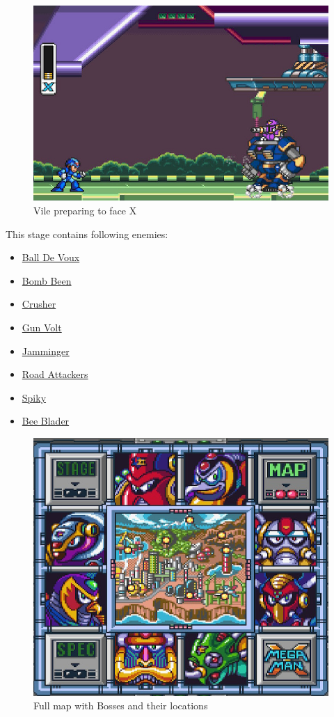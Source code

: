 \begin{figure}[htp]
	\centering
	\includegraphics[width=0.5\linewidth]{figures/X1/Highway_screenshot_3.jpg}
	\caption{Vile preparing to face X}
\end{figure}
This stage contains following enemies\cite{wiki:Highway}:
\begin{itemize}
	\item \hyperlink{enem:Ball_De_Voux}{Ball De Voux }
	\item \hyperlink{enem:Bomb_Been}{Bomb Been }
	\item \hyperlink{enem:Crusher}{Crusher }
	\item \hyperlink{enem:Gun_Volt}{Gun Volt}
	\item \hyperlink{enem:Jamminger}{Jamminger}
	\item \hyperlink{enem:Road_Attackers}{Road Attackers }
	\item \hyperlink{enem:Spiky}{Spiky }
	\item \hyperlink{miniboss:Bee_Blader}{Bee Blader }
\end{itemize}

\begin{figure}[htp]
	\centering
	\includegraphics[width=0.5\linewidth]{figures/X1/Full_map.png}
	\caption{Full map with Bosses and their locations}
\end{figure}
 
 
 
